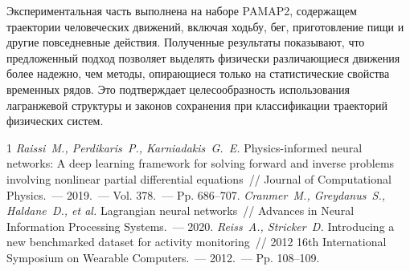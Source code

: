 \documentclass[twoside]{article}
\begin{document}
Экспериментальная часть выполнена на наборе PAMAP2, содержащем траектории человеческих движений, включая ходьбу, бег, приготовление пищи и другие повседневные действия. Полученные результаты показывают, что предложенный подход позволяет выделять физически различающиеся движения более надежно, чем методы, опирающиеся только на статистические свойства временных рядов. Это подтверждает целесообразность использования лагранжевой структуры и законов сохранения при классификации траекторий физических систем.

\begin{thebibliography}{1}
    \emph{Raissi~M., Perdikaris~P., Karniadakis~G.~E.}
    Physics-informed neural networks: A deep learning framework for solving forward and inverse problems involving nonlinear partial differential equations~//
    Journal of Computational Physics.~--- 2019.~--- Vol. 378.~--- Pp. 686--707.
    \emph{Cranmer~M., Greydanus~S., Haldane~D., et al.}
    Lagrangian neural networks~//
    Advances in Neural Information Processing Systems.~--- 2020.
    \emph{Reiss~A., Stricker~D.}
    Introducing a new benchmarked dataset for activity monitoring~//
    2012 16th International Symposium on Wearable Computers.~--- 2012.~--- Pp. 108--109.
\end{thebibliography}
\end{document}
